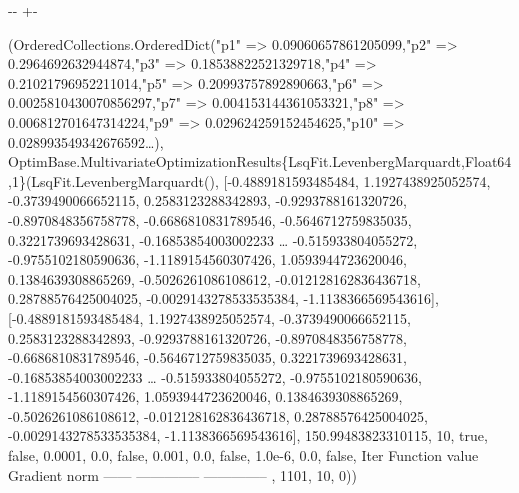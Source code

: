 \documentclass[a4paper,10pt,english]{sphinxmanual}
\newlength\nbsphinxcodecellspacing
\begin{document}
{

\kern-\sphinxverbatimsmallskipamount\kern-\baselineskip
\kern+\FrameHeightAdjust\kern-\fboxrule
\vspace{\nbsphinxcodecellspacing}

\begin{sphinxVerbatim}[commandchars=\\\{\}]
\llap{\color{nbsphinxout}[34]:\,\hspace{\fboxrule}\hspace{\fboxsep}}(OrderedCollections.OrderedDict("p1" => 0.09060657861205099,"p2" => 0.2964692632944874,"p3" => 0.18538822521329718,"p4" => 0.21021796952211014,"p5" => 0.20993757892890663,"p6" => 0.0025810430070856297,"p7" => 0.004153144361053321,"p8" => 0.006812701647314224,"p9" => 0.029624259152454625,"p10" => 0.028993549342676592…), OptimBase.MultivariateOptimizationResults\{LsqFit.LevenbergMarquardt,Float64,1\}(LsqFit.LevenbergMarquardt(), [-0.4889181593485484, 1.1927438925052574, -0.3739490066652115, 0.2583123288342893, -0.9293788161320726, -0.8970848356758778, -0.6686810831789546, -0.5646712759835035, 0.3221739693428631, -0.16853854003002233  …  -0.515933804055272, -0.9755102180590636, -1.1189154560307426, 1.0593944723620046, 0.1384639308865269, -0.5026261086108612, -0.012128162836436718, 0.28788576425004025, -0.0029143278533535384, -1.1138366569543616], [-0.4889181593485484, 1.1927438925052574, -0.3739490066652115, 0.2583123288342893, -0.9293788161320726, -0.8970848356758778, -0.6686810831789546, -0.5646712759835035, 0.3221739693428631, -0.16853854003002233  …  -0.515933804055272, -0.9755102180590636, -1.1189154560307426, 1.0593944723620046, 0.1384639308865269, -0.5026261086108612, -0.012128162836436718, 0.28788576425004025, -0.0029143278533535384, -1.1138366569543616], 150.99483823310115, 10, true, false, 0.0001, 0.0, false, 0.001, 0.0, false, 1.0e-6, 0.0, false, Iter     Function value   Gradient norm
------   --------------   --------------
, 1101, 10, 0))
\end{sphinxVerbatim}
}

{
\begin{sphinxVerbatim}[commandchars=\\\{\}]
\llap{\color{nbsphinxin}[35]:\,\hspace{\fboxrule}\hspace{\fboxsep}}
\end{sphinxVerbatim}
}
\end{document}
